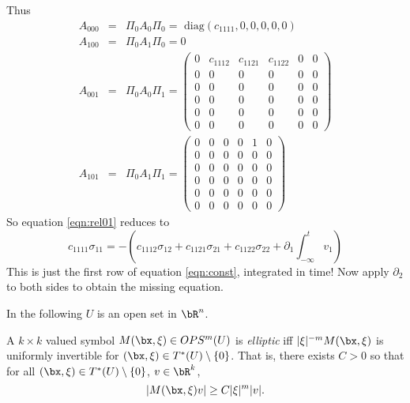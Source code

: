 Thus
\begin{eqnarray}
  A_{000} &=& \Pi_0 A_0 \Pi_0 = \mbox{ diag}(c_{1111},0,0,0,0,0) \nonumber \\
  A_{100} &=& \Pi_0 A_1 \Pi_0 = 0 \nonumber \\
  A_{001} &=& \Pi_0 A_0 \Pi_1 =
              \left(
              \begin{array}{cccccc}
                0 & c_{1112} & c_{1121} & c_{1122} & 0 & 0 \\
                0 & 0 & 0 & 0 & 0 & 0 \\
                0 & 0 & 0 & 0 & 0 & 0 \\                
                0 & 0 & 0 & 0 & 0 & 0 \\
                0 & 0 & 0 & 0 & 0 & 0 \\
                0 & 0 & 0 & 0 & 0 & 0
              \end{array}
                                    \right) \nonumber \\
  A_{101} &=& \Pi_0 A_1 \Pi_1 =
                            \left(
              \begin{array}{cccccc}
                0 & 0 & 0 & 0 & 1 & 0 \\
                0 & 0 & 0 & 0 & 0 & 0 \\
                0 & 0 & 0 & 0 & 0 & 0 \\                
                0 & 0 & 0 & 0 & 0 & 0 \\
                0 & 0 & 0 & 0 & 0 & 0 \\
                0 & 0 & 0 & 0 & 0 & 0
              \end{array}
                                    \right)
                                    \label{eqn:ela0}
\end{eqnarray}
So equation \ref{eqn:rel01} reduces to
\[
  c_{1111}\sigma_{11} = -(c_{1112}\sigma_{12} + c_{1121}\sigma_21 + c_{1122}\sigma_{22} + \partial_1 \int_{-\infty}^t v_1)
\]
This is just the first row of equation \ref{eqn:const}, integrated in time! Now apply $\partial_2$ to both sides to obtain the missing equation.


In the following $U$ is an open set in $\bR^n$.

\begin{definition}
  A $k \times k$ valued symbol $M(\bx,\xi) \in OPS^m(U)$ is {\em elliptic} iff $|\xi|^{-m}M(\bx,\xi)$ is uniformly invertible for $(\bx,\xi) \in T^*(U) \setminus \{0\}$. That is, there exists $C>0$ so that for all  $(\bx,\xi) \in T^*(U) \setminus \{0\}$, $v \in \bR^k$,
  \[
    |M(\bx,\xi)v| \ge C|\xi|^m|v|.
  \]
\end{definition}

